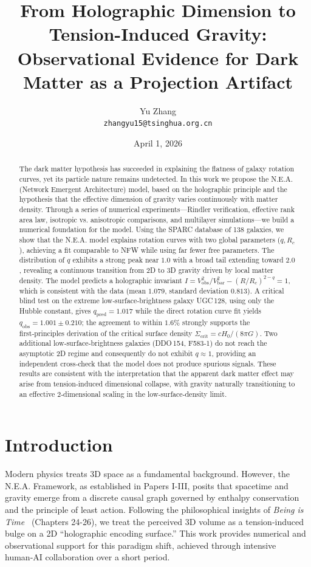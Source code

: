 \documentclass[12pt,a4paper]{article}
\title{From Holographic Dimension to Tension-Induced Gravity:\\
Observational Evidence for Dark Matter as a Projection Artifact}
\author{Yu Zhang\\ \texttt{zhangyu15@tsinghua.org.cn}}
\date{April 1, 2026}
\begin{document}
\maketitle

\begin{abstract}
The dark matter hypothesis has succeeded in explaining the flatness of galaxy rotation curves, yet its particle nature remains undetected. In this work we propose the N.E.A. (Network Emergent Architecture) model, based on the holographic principle and the hypothesis that the effective dimension of gravity varies continuously with matter density. Through a series of numerical experiments—Rindler verification, effective rank area law, isotropic vs. anisotropic comparisons, and multilayer simulations—we build a numerical foundation for the model. Using the SPARC database of 138 galaxies, we show that the N.E.A. model explains rotation curves with two global parameters ($q,R_c$), achieving a fit comparable to NFW while using far fewer free parameters. The distribution of $q$ exhibits a strong peak near $1.0$ with a broad tail extending toward $2.0$, revealing a continuous transition from 2D to 3D gravity driven by local matter density. The model predicts a holographic invariant $I = V_{\text{obs}}^2/V_{\text{bar}}^2 - (R/R_c)^{2-q} = 1$, which is consistent with the data (mean $1.079$, standard deviation $0.813$). A critical blind test on the extreme low‑surface‑brightness galaxy UGC 128, using only the Hubble constant, gives $q_{\text{pred}}=1.017$ while the direct rotation curve fit yields $q_{\text{obs}}=1.001\pm0.210$; the agreement to within $1.6\%$ strongly supports the first‑principles derivation of the critical surface density $\Sigma_{\text{crit}}=cH_0/(8\pi G)$. Two additional low‑surface‑brightness galaxies (DDO 154, F583‑1) do not reach the asymptotic 2D regime and consequently do not exhibit $q\approx 1$, providing an independent cross‑check that the model does not produce spurious signals. These results are consistent with the interpretation that the apparent dark matter effect may arise from tension‑induced dimensional collapse, with gravity naturally transitioning to an effective 2‑dimensional scaling in the low‑surface‑density limit.
\end{abstract}

\section{Introduction}
Modern physics treats 3D space as a fundamental background. However, the N.E.A. Framework, as established in Papers I-III, posits that spacetime and gravity emerge from a discrete causal graph governed by enthalpy conservation and the principle of least action. Following the philosophical insights of \textit{Being is Time}~\cite{book} (Chapters 24-26), we treat the perceived 3D volume as a tension‑induced bulge on a 2D “holographic encoding surface.” This work provides numerical and observational support for this paradigm shift, achieved through intensive human‑AI collaboration over a short period.
\end{document}

